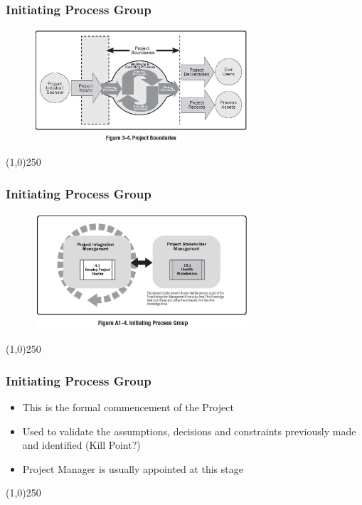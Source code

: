 \begin{frame}
\frametitle{Initiating Process Group}
 \begin{figure}
 	\centering
 		\includegraphics[width = 8cm]{images/Fig3-4.jpg}
 	\label{fig:3-4}
 \end{figure}
\end{frame}
\begin{center}\line(1,0){250}\end{center}



\begin{frame}
\frametitle{Initiating Process Group}
 \begin{figure}
 	\centering
 		\includegraphics[width = 8cm]{images/FigA1-4.jpg}
 	\label{fig:1-4}
 \end{figure}
\end{frame}
\begin{center}\line(1,0){250}\end{center}



\begin{frame}
\frametitle{Initiating Process Group}
\begin{itemize}
	\item This is the formal commencement of the Project
	\item Used to validate the assumptions, decisions and constraints previously made and identified (Kill Point?)
	\item Project Manager is usually appointed at this stage
\end{itemize}
\end{frame}
\begin{center}\line(1,0){250}\end{center}



